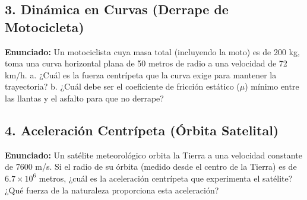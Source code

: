 \documentclass[12pt, letterpaper]{article}
\begin{document}
	\subsection*{3. Dinámica en Curvas (Derrape de Motocicleta)}
	\noindent \textbf{Enunciado:} Un motociclista cuya masa total (incluyendo la moto) es de 200 kg, toma una curva horizontal plana de 50 metros de radio a una velocidad de 72 km/h. a. ¿Cuál es la fuerza centrípeta que la curva exige para mantener la trayectoria? b. ¿Cuál debe ser el coeficiente de fricción estático ($\mu$) mínimo entre las llantas y el asfalto para que no derrape?
	
	
	\subsection*{4. Aceleración Centrípeta (Órbita Satelital)}
	\noindent \textbf{Enunciado:} Un satélite meteorológico orbita la Tierra a una velocidad constante de 7600 m/s. Si el radio de su órbita (medido desde el centro de la Tierra) es de $6.7 \times 10^6$ metros, ¿cuál es la aceleración centrípeta que experimenta el satélite? ¿Qué fuerza de la naturaleza proporciona esta aceleración?
	
	
\end{document}
